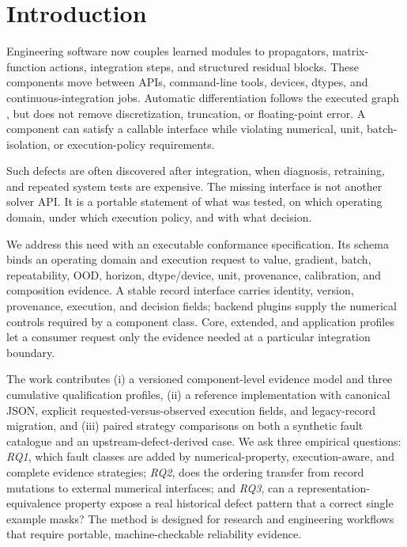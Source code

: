 \documentclass[preprint,12pt]{elsarticle}
\begin{document}
\section{Introduction}
Engineering software now couples learned modules to propagators, matrix-function actions, integration steps, and structured residual blocks. These components move between APIs, command-line tools, devices, dtypes, and continuous-integration jobs. Automatic differentiation follows the executed graph \citep{baydin2018autodiff}, but does not remove discretization, truncation, or floating-point error. A component can satisfy a callable interface while violating numerical, unit, batch-isolation, or execution-policy requirements.

Such defects are often discovered after integration, when diagnosis, retraining, and repeated system tests are expensive. The missing interface is not another solver API. It is a portable statement of what was tested, on which operating domain, under which execution policy, and with what decision.

We address this need with an executable conformance specification. Its schema binds an operating domain and execution request to value, gradient, batch, repeatability, OOD, horizon, dtype/device, unit, provenance, calibration, and composition evidence. A stable record interface carries identity, version, provenance, execution, and decision fields; backend plugins supply the numerical controls required by a component class. Core, extended, and application profiles let a consumer request only the evidence needed at a particular integration boundary.

The work contributes (i) a versioned component-level evidence model and three cumulative qualification profiles, (ii) a reference implementation with canonical JSON, explicit requested-versus-observed execution fields, and legacy-record migration, and (iii) paired strategy comparisons on both a synthetic fault catalogue and an upstream-defect-derived case. We ask three empirical questions: \emph{RQ1}, which fault classes are added by numerical-property, execution-aware, and complete evidence strategies; \emph{RQ2}, does the ordering transfer from record mutations to external numerical interfaces; and \emph{RQ3}, can a representation-equivalence property expose a real historical defect pattern that a correct single example masks? The method is designed for research and engineering workflows that require portable, machine-checkable reliability evidence.
\end{document}
